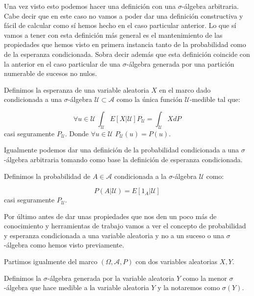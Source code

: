 Una vez visto esto podemos hacer una definición con una $\sigma$-álgebra arbitraria. Cabe decir que en este caso no vamos a poder dar una definición constructiva y fácil de calcular como sí hemos hecho en el caso particular anterior. Lo que sí vamos a tener con esta definición más general es el mantenimiento de las propiedades que hemos visto en primera instancia tanto de la probabilidad como de la esperanza condicionada. Sobra decir además que esta definición coincide con la anterior en el caso particular de una $\sigma$-álgebra generada por una partición numerable de sucesos no nulos.

\begin{definicion}
	Definimos la esperanza de una variable aleatoria $X$ en el marco dado condicionada a una $\sigma$-álgebra $\mathcal{U}\subset \mathcal{A}$ como la única función $\mathcal{U}$-medible tal que:
	
	$$\forall u \in \mathcal{U} \ \int_{\mathcal{U}}E[X | \mathcal{U}]P_{\mathcal{U}} = \int_{\mathcal{U}}X dP$$ casi seguramente $P_{\mathcal{U}}$. Donde $\forall u\in \mathcal{U}$ $P_{\mathcal{U}}(u) = P(u)$.
\end{definicion}

Igualmente podemos dar una definición de la probabilidad condicionada a una $\sigma$-álgebra arbitraria tomando como base la definición de esperanza condicionada.

\begin{definicion}
	Definimos la probabilidad de $A\in \mathcal{A}$ condicionada a la $\sigma$-álgebra $\mathcal{U}$ como:
	
	$$P(A | \mathcal{U}) = E[1_A | \mathcal{U}]$$ casi seguramente $P_{\mathcal{U}}$.
\end{definicion}

Por último antes de dar unas propiedades que nos den un poco más de conocimiento y herramientas de trabajo vamos a ver el concepto de probabilidad y esperanza condicionada a una variable aleatoria y no a un suceso o una $\sigma$-álgebra como hemos visto previamente.

Partimos igualmente del marco $(\Omega , \mathcal{A} , P)$ con dos variables aleatorias $X,Y$.

\begin{definicion}
	Definimos la $\sigma$-álgebra generada por la variable aleatoria $Y$ como la menor $\sigma$-álgebra que hace medible a la variable aleatoria $Y$ y la notaremos como $\sigma (Y)$.
\end{definicion}

